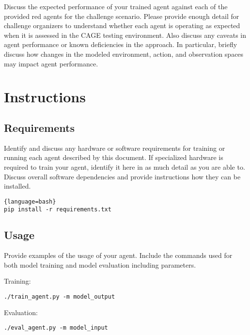 \documentclass{article}
\begin{document}
Discuss the expected performance of your trained agent against each of the provided red agents for the challenge scenario.  Please provide enough detail for challenge organizers to understand whether each agent is operating as expected when it is assessed in the CAGE testing environment.  Also discuss any caveats in agent performance or known deficiencies in the approach.  In particular, briefly discuss how changes in the modeled environment, action, and observation spaces may impact agent performance. 

\section{Instructions}
\subsection{Requirements}
\label{sec:requirements}

Identify and discuss any hardware or software requirements for training or running each agent described by this document.  If specialized hardware is required to train your agent, identify it here in as much detail as you are able to.  Discuss overall software dependencies and provide instructions how they can be installed. 

\begin{lstlisting}{language=bash}
pip install -r requirements.txt 
\end{lstlisting}

\subsection{Usage}
\label{sec:usage}
Provide examples of the usage of your agent. Include the commands used for both model training and model evaluation including parameters. 

Training:
\begin{lstlisting}
./train_agent.py -m model_output
\end{lstlisting}

Evaluation:
\begin{lstlisting}
./eval_agent.py -m model_input
\end{lstlisting}



\end{document}
